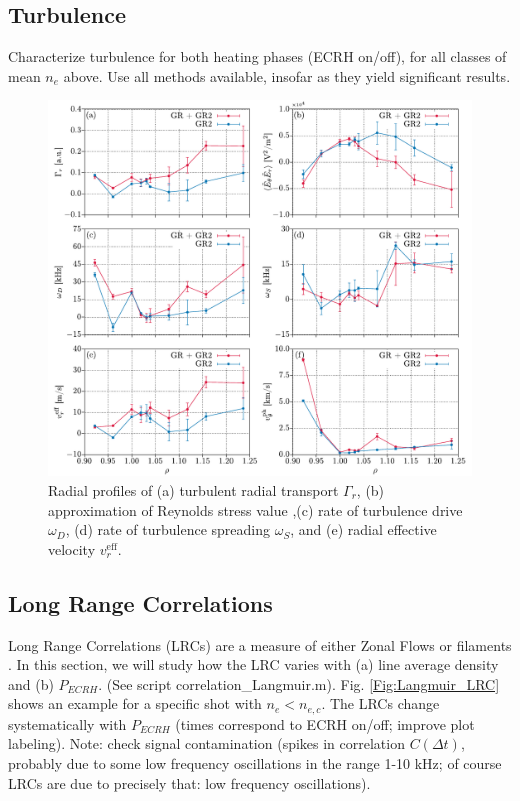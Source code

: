 \documentclass[preprint,12pt,authoryear]{elsarticle}
\begin{document}
\subsection{Turbulence}

Characterize turbulence for both heating phases (ECRH on/off), for all classes of mean $n_e$ above. Use all methods available, insofar as they yield significant results.

\begin{figure}[!ht]
    \centering
    \includegraphics[width=1.0\linewidth]{Images/Rake_D_low_density_2.pdf}
    \caption{Radial profiles of (a) turbulent radial transport $\Gamma_{r}$, (b) approximation of Reynolds stress value ,(c) rate of turbulence drive $\omega_D$, (d) rate of turbulence spreading $\omega_S$, and (e) radial effective velocity $v^{\mathrm{eff}}_{r}$.}
    \label{Fig:Rake_D_low_density_2}
\end{figure}
\subsection{Long Range Correlations}

Long Range Correlations (LRCs) are a measure of either Zonal Flows or filaments \cite{Milligen:2013b}. 
In this section, we will study how the LRC varies with (a) line average density and (b) $P_{ECRH}$.
(See script correlation\_Langmuir.m).
Fig. \ref{Fig:Langmuir_LRC} shows an example for a specific shot with $n_e < n_{e,c}$. 
The LRCs change systematically with $P_{ECRH}$ (times correspond to ECRH on/off; improve plot labeling). Note: check signal contamination (spikes in correlation $C(\Delta t)$, probably due to some low frequency oscillations in the range 1-10 kHz; of course LRCs are due to precisely that: low frequency oscillations).
\end{document}
